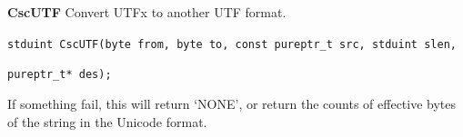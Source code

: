 
\textbf{CscUTF} Convert UTFx to another UTF format.

\verb|stduint CscUTF(byte from, byte to, const pureptr_t src, stduint slen, |

\verb|pureptr_t* des);|

If something fail, this will return `NONE', or return the counts of effective bytes of the string in the Unicode format.

